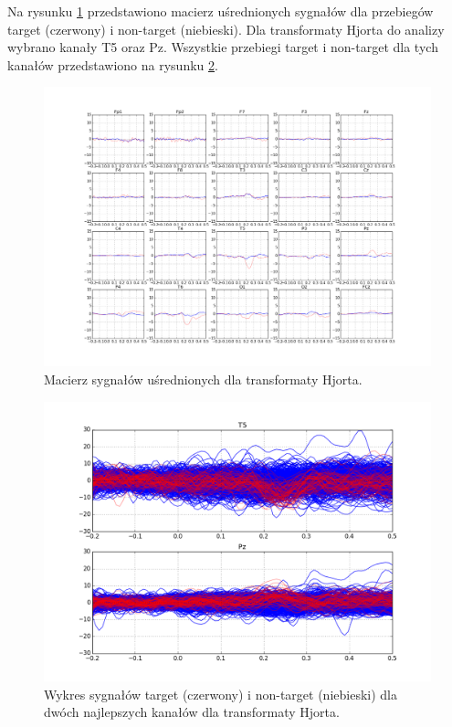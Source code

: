 \documentclass[licencjacka,openright]{pracamgr}
\begin{document}
Na rysunku \ref{maciez_hjorth} przedstawiono macierz uśrednionych sygnałów dla przebiegów target (czerwony) i non-target (niebieski). Dla transformaty Hjorta do analizy wybrano kanały T5 oraz Pz. Wszystkie przebiegi target i non-target dla tych kanałów przedstawiono na rysunku \ref{sygnal_hjorth}.

\begin{figure}[H]
\centering
\includegraphics[scale=0.35, trim=10mm 25mm 10mm 25mm, clip=True]{pics/macierz_hjorth.png}
\caption{Macierz sygnałów uśrednionych dla transformaty Hjorta.}
\label{maciez_hjorth}
\end{figure}

\begin{figure}[H]
\centering
\includegraphics[scale=0.55, trim=10mm 15mm 10mm 15mm, clip=True]{pics/sygnal_hjorth.png}
\caption{Wykres sygnałów target (czerwony) i non-target (niebieski) dla dwóch najlepszych kanałów dla transformaty Hjorta.}
\label{sygnal_hjorth}
\end{figure}
\end{document}
